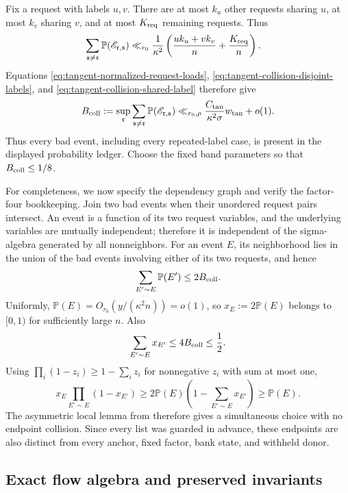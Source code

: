 \documentclass[11pt]{article}
\numberwithin{equation}{section}
\theoremstyle{definition}
\theoremstyle{remark}
\newcommand{\1}{\mathbf 1}
\begin{document}
Fix a request with labels \(u,v\).  There are at most \(k_u\) other
requests sharing \(u\), at most \(k_v\) sharing \(v\), and at most
\(K_{\rm req}\) remaining requests.  Thus
\begin{align*}
 \sum_{\mathfrak s\ne\mathfrak r}
   \mathbb P(\mathscr E_{\mathfrak r,\mathfrak s})
 &\ll_{r_0}\frac1{\kappa^2}
    \left(\frac{uk_u+vk_v}{n}+\frac{K_{\rm req}}n\right).
\end{align*}
Equations \eqref{eq:tangent-normalized-request-loads},
\eqref{eq:tangent-collision-disjoint-labels}, and
\eqref{eq:tangent-collision-shared-label} therefore give
\begin{equation}
 B_{\rm coll}:=
 \sup_{\mathfrak r}
 \sum_{\mathfrak s\ne\mathfrak r}
       \mathbb P(\mathscr E_{\mathfrak r,\mathfrak s})
 \ll_{r_0,\rho}
 \frac{C_{\rm tan}}{\kappa^2\sigma}w_{\rm tan}+o(1).
\label{eq:tangent-per-request-collision-sum}
\end{equation}
Thus every bad event, including every repeated-label case, is present in
the displayed probability ledger.  Choose the fixed band parameters so
that \(B_{\rm coll}\leq1/8\).

For completeness, we now specify the dependency graph and verify the
factor-four bookkeeping.  Join two bad events when their unordered
request pairs intersect.  An event is a function of its two request
variables, and the underlying variables are mutually independent;
therefore it is independent of the sigma-algebra generated by all
nonneighbors.  For an event \(E\), its neighborhood lies in the union of
the bad events involving either of its two requests, and hence
\[
 \sum_{E'\sim E}\mathbb P(E')\leq2B_{\rm coll}.
\]
Uniformly, \(\mathbb P(E)=O_{r_0}(y/(\kappa^2n))=o(1)\), so
\(x_E:=2\mathbb P(E)\) belongs to \([0,1)\) for sufficiently large \(n\).
Also
\[
 \sum_{E'\sim E}x_{E'}\leq4B_{\rm coll}\leq\frac12.
\]
Using \(\prod_i(1-z_i)\geq1-\sum_i z_i\) for nonnegative \(z_i\) with
sum at most one,
\[
 x_E\prod_{E'\sim E}(1-x_{E'})
 \geq2\mathbb P(E)
       \left(1-\sum_{E'\sim E}x_{E'}\right)
 \geq\mathbb P(E).
\]
The asymmetric local lemma from  therefore gives a
simultaneous choice with no endpoint collision.  Since every list was
guarded in advance, these endpoints are also distinct from every anchor,
fixed factor, bank state, and withheld donor.

\subsection{Exact flow algebra and preserved invariants}
\label{subsec:tangent-invariants}
\end{document}
